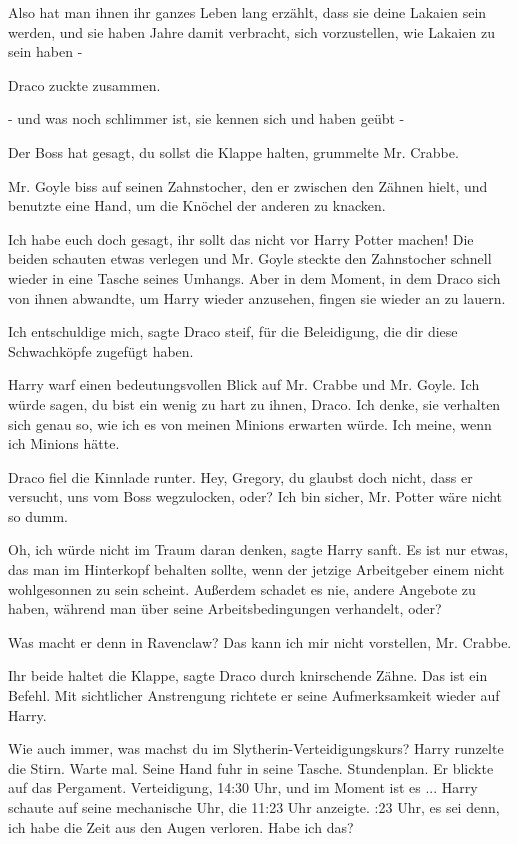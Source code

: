 \glqq Also hat man ihnen ihr ganzes Leben lang erzählt, dass sie deine Lakaien
sein werden, und sie haben Jahre damit verbracht, sich vorzustellen, wie Lakaien
zu sein haben -\grqq{}

Draco zuckte zusammen.

\glqq - und was noch schlimmer ist, sie kennen sich und haben geübt -\grqq{}

\glqq Der Boss hat gesagt, du sollst die Klappe halten\grqq{}, grummelte Mr.
Crabbe.

Mr. Goyle biss auf seinen Zahnstocher, den er zwischen den Zähnen hielt, und
benutzte eine Hand, um die Knöchel der anderen zu knacken.

\glqq Ich habe euch doch gesagt, ihr sollt das nicht vor Harry Potter
machen!\grqq{} Die beiden schauten etwas verlegen und Mr. Goyle steckte den
Zahnstocher schnell wieder in eine Tasche seines Umhangs. Aber in dem Moment, in
dem Draco sich von ihnen abwandte, um Harry wieder anzusehen, fingen sie wieder
an zu lauern.

\glqq Ich entschuldige mich\grqq{}, sagte Draco steif, \glqq für die
Beleidigung, die dir diese Schwachköpfe zugefügt haben.\grqq{}

Harry warf einen bedeutungsvollen Blick auf Mr. Crabbe und Mr. Goyle. \glqq Ich
würde sagen, du bist ein wenig zu hart zu ihnen, Draco. Ich denke, sie verhalten
sich genau so, wie ich es von meinen Minions erwarten würde. Ich meine, wenn ich
Minions hätte.\grqq{}

Draco fiel die Kinnlade runter. \glqq Hey, Gregory, du glaubst doch nicht, dass
er versucht, uns vom Boss wegzulocken, oder?\grqq{} \glqq Ich bin sicher, Mr.
Potter wäre nicht so dumm.\grqq{}

\glqq Oh, ich würde nicht im Traum daran denken\grqq{}, sagte Harry sanft.
\glqq Es ist nur etwas, das man im Hinterkopf behalten sollte, wenn der jetzige
Arbeitgeber einem nicht wohlgesonnen zu sein scheint. Außerdem schadet es nie,
andere Angebote zu haben, während man über seine Arbeitsbedingungen verhandelt,
oder?\grqq{}

\glqq Was macht er denn in Ravenclaw?\grqq{} \glqq Das kann ich mir nicht
vorstellen, Mr. Crabbe.\grqq{}

\glqq Ihr beide haltet die Klappe\grqq{}, sagte Draco durch knirschende Zähne.
\glqq Das ist ein Befehl.\grqq{} Mit sichtlicher Anstrengung richtete er seine
Aufmerksamkeit wieder auf Harry.

\glqq Wie auch immer, was machst du im Slytherin-Verteidigungskurs?\grqq{} Harry
runzelte die Stirn. \glqq Warte mal.\grqq{} Seine Hand fuhr in seine Tasche.
\glqq Stundenplan.\grqq{} Er blickte auf das Pergament. \glqq Verteidigung,
14:30 Uhr, und im Moment ist es ...\grqq{} Harry schaute auf seine mechanische
Uhr, die 11:23 Uhr anzeigte. :23 Uhr, es sei denn, ich habe die Zeit aus
den Augen verloren. Habe ich das?\grqq{}

